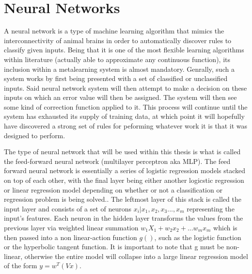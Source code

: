 \section{Neural Networks}
A neural network is a type of machine learning algorithm that mimics
the interconnectivity of animal brains in order to automatically
discover rules to classify given inputs. Being that it is one of the most
flexible learning algorithms within literature (actually able to
approximate any continuous function)\cite{Hornik}, its inclusion within a
metalearning system is almost mandatory.  Genrally, such a system
works by first being presented with a set of classified or
unclassified inputs. Said neural network system will then attempt to
make a decision on these inputs on which an error value will then be
assigned. The system will then see some kind of correction function
applied to it. This process will continue until the system has
exhausted its supply of training data, at which point it will
hopefully have discovered a strong set of rules for peforming whatever
work it is that it was designed to perform.

The type of neural network that will be used within this thesis is
what is called the feed-forward neural network (multilayer perceptron
aka MLP). The feed forward neural network is essentially a series of
logistic regression models stacked on top of each other, with the
final layer being either another logicstic regression or linear
regression model depending on whether or not a classification or
regression problem is being solved.\cite{Murphy}. The leftmost
layer of this stack is called the input layer and consists of a set of
neurons ${x_i|x_1,x_2,x_3...,x_m}$ representing the input's
features. Each neuron in the hidden layer transforms the values from
the previous layer via weighted linear summation $w_1X_1 + w_2x_2 +...w_mx_m$
which is then passed into a non linear-action function $g()$, such as the logistic
function or the hyperbolic tangent function. It is important to note that g must be non-linear,
otherwise the entire model will collapse into a large linear regression model of
the form $y = w^T(Vx)$. \cite{Murphy}

